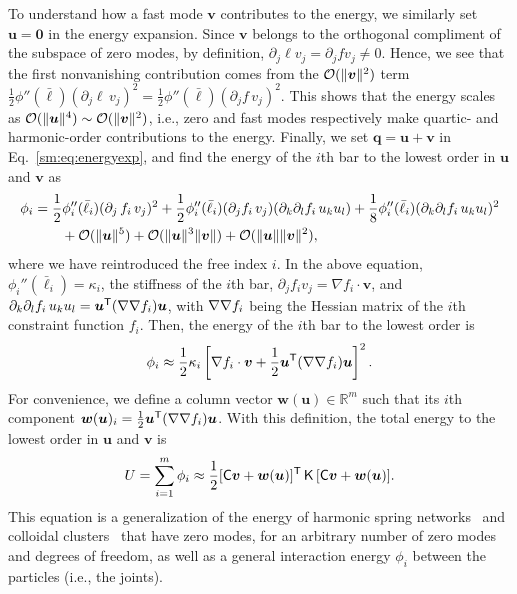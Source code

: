 To understand how a fast mode $\bm{v}$ contributes to the energy, we similarly set $\bm{u} = \bm{0}$ in the energy expansion.
Since $\bm{v}$ belongs to the orthogonal compliment of the subspace of zero modes, by definition, $\partial_j \ell v_j = \partial_j f v_j \ne 0$.
Hence, we see that the first nonvanishing contribution comes from the $\mathcal{O}(\lVert\bm{v}\rVert^2)$ term $\frac{1}{2}\phi''(\bar{\ell})(\partial_j \ell\, v_j)^2 = \frac{1}{2}\phi''(\bar{\ell})(\partial_j f\, v_j)^2$.
This shows that the energy scales as $\mathcal{O}(\lVert\bm{u}\rVert^4) \sim \mathcal{O}(\lVert\bm{v}\rVert^2)$, i.e., zero and fast modes respectively make quartic- and harmonic-order contributions to the energy.
Finally, we set $\bm{q} = \bm{u} + \bm{v}$ in Eq.~\eqref{sm:eq:energyexp}, and find the energy of the $i$th bar to the lowest order in $\bm{u}$ and $\bm{v}$ as
%
\begin{equation}
  \begin{aligned}
    \phi_i &= \frac{1}{2}\phi_i''(\bar{\ell}_i)(\partial_j\, f_i\, v_j)^2 + \frac{1}{2}\phi''_i(\bar{\ell}_i)(\partial_j f_i\, v_j)(\partial_k \partial_l f_i\, u_k u_l) + \frac{1}{8}\phi''_i(\bar{\ell}_i)(\partial_k \partial_l f_i\, u_k u_l)^2\\
           &\qquad+ \mathcal{O}(\lVert\bm{u}\rVert^5) + \mathcal{O}(\lVert\bm{u}\rVert^{3}\lVert\bm{v}\rVert) +\mathcal{O}(\lVert\bm{u}\rVert\lVert\bm{v}\rVert^{2}),
  \end{aligned}
\end{equation}
%
where we have reintroduced the free index $i$.
In the above equation, $\phi_{i}''(\bar{\ell}_i) = \kappa_i$, the stiffness of the $i$th bar, $\partial_j f_i v_j = \nabla f_i\cdot\bm{v}$, and $\partial_k\partial_l f_i\, u_k u_l = \bm{u}^\mathsf{T}(\nabla\nabla f_i)\bm{u}$, with $\nabla\nabla f_i$ being the Hessian matrix of the $i$th constraint function $f_i$.
Then, the energy of the $i$th bar to the lowest order is
%
\begin{equation}
  \phi_i \approx \frac{1}{2}\kappa_i \left[\nabla f_i\cdot\bm{v} + \frac{1}{2}\bm{u}^\mathsf{T}(\nabla\nabla f_i)\bm{u}\right]^2.
\end{equation}
%
For convenience, we define a column vector $\bm{w}(\bm{u}) \in \mathbb{R}^{m}$ such that its $i$th component $\bm{w}(\bm{u})_{i} = \frac{1}{2}\bm{u}^\mathsf{T}(\nabla\nabla f_{i})\bm{u}$.
With this definition, the total energy to the lowest order in $\bm{u}$ and $\bm{v}$ is
%
\begin{equation}
  U = \sum_{i=1}^m \phi_i \approx \frac{1}{2} [\mathsf{C}\bm{v} + \bm{w}(\bm{u})]^\mathsf{T}\,\mathsf{K}\,[\mathsf{C}\bm{v} + \bm{w}(\bm{u})].
  \label{eq:energy_singular}
\end{equation}
%
This equation is a generalization of the energy of harmonic spring networks~\cite{zhang2016,woodhouse2018} and colloidal clusters~\cite{kallus2017} that have zero modes, for an arbitrary number of zero modes and degrees of freedom, as well as a general interaction energy $\phi_{i}$ between the particles (i.e., the joints).

